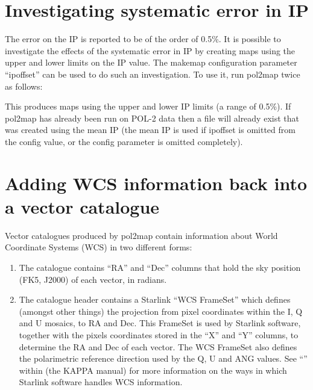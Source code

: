\section{Investigating systematic error in IP}


The error on the IP is reported to be of the order of 0.5\%.  It is
possible to investigate the effects of the systematic error in IP by
creating maps using the upper and lower limits on the IP value. The
makemap configuration parameter ``ipoffset'' can be used to do such an
investigation. To use it, run pol2map twice as follows:

\begin{terminalv}
\end{terminalv}

This produces maps using the upper and lower IP limits (a range of
0.5\%). If pol2map has already been run on POL-2 data then a file will
already exist that was created using the mean IP (the mean IP is used
if ipoffset is omitted from the config value, or the config parameter
is omitted completely).



\section{\label{sec:wcscopy}Adding WCS information back into a vector catalogue}
Vector catalogues produced by pol2map contain information about World Coordinate
Systems (WCS) in two different forms:

\begin{enumerate}
\item The catalogue contains ``RA'' and ``Dec'' columns that hold the sky position
(FK5, J2000) of each vector, in radians.
\item The catalogue header contains a Starlink ``WCS FrameSet'' which defines
(amongst other things) the projection from pixel coordinates within the I, Q and
U mosaics, to RA and Dec. This FrameSet is used by Starlink software, together
with the pixels coordinates stored in the ``X'' and ``Y'' columns, to determine
the RA and Dec of each vector. The WCS FrameSet also defines the polarimetric
reference direction used by the Q, U and ANG values. See
``''
within  (the KAPPA manual) for more information on
the ways in which Starlink software handles WCS information.
\end{enumerate}

